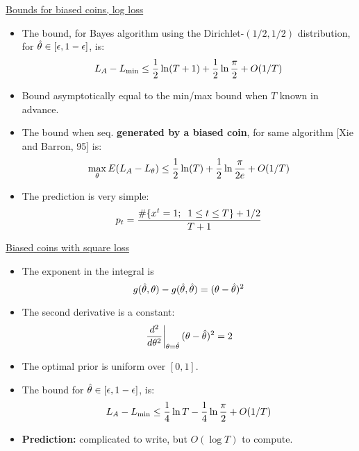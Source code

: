 \begin{flushleft}
\begin{LARGE}
\pagebreak
\begin{center}
\underline{Bounds for biased coins, log loss}
\end{center}

\begin{itemize}
\item
The bound, for Bayes algorithm using the Dirichlet-$(1/2,1/2)$
distribution,
for $\hat{\theta} \in [\epsilon,1-\epsilon]$, is:
\[
L_A - L_{\min} \leq {1 \over 2} \ln (T+1) 
                     + {1 \over 2} \ln {\pi \over 2}
                     + O(1/T)
\]
\item
Bound asymptotically equal to the min/max bound when $T$ known in advance.
\item
The bound when seq. {\bf generated by a biased coin}, for same
algorithm [Xie and Barron, 95] is:
\[
\max_{\theta}
E(L_A - L_{\theta}) 
\leq {1 \over 2} \ln (T) 
   + {1 \over 2} \ln {\pi \over 2e}
   + O(1/T)
\]
\item
The prediction is very simple:
\[
p_t = {\#\{x^t=1;\;\; 1 \leq t \leq T \} + 1/2 \over T+1} 
\]
\end{itemize}

\pagebreak
\begin{center}
\underline{Biased coins with square loss}
\end{center}

\begin{itemize}
\item
The exponent in the integral is
\[
g(\hat{\theta},\theta) - g(\hat{\theta},\hat{\theta})
=
(\theta-\hat{\theta})^2
\]
\item
The second derivative is a constant:
\[
\left. {d^2 \over d\theta^2} \right|_{\theta=\hat{\theta}} 
(\theta-\hat{\theta})^2 = 2
\]
\item
The optimal prior is uniform over $[0,1]$.
\item
The bound for $\hat{\theta} \in [\epsilon,1-\epsilon]$, is:
\[
L_A - L_{\min} \leq {1 \over 4} \ln T 
                     - {1 \over 4} \ln {\pi \over 2}
                     + O(1/T)
\]
\item
{\bf Prediction:} complicated to write, but $O(\log T)$ to compute.
\end{itemize}


\end{LARGE}
\end{flushleft}
